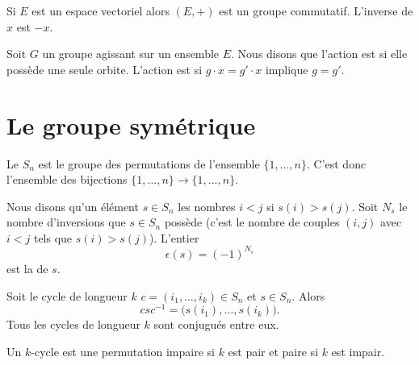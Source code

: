 \begin{example}     \label{ExemMaKdwt}
    Si \( E\) est un espace vectoriel alors \( (E,+)\) est un groupe commutatif. L'inverse de \( x\) est \( -x\).
\end{example}

\begin{definition}
    Soit \( G\) un groupe agissant sur un ensemble \( E\). Nous disons que l'action est  si elle possède une seule orbite. L'action est  si \( g\cdot x=g'\cdot x\) implique \( g=g'\).
\end{definition}

\section{Le groupe symétrique}

Le  \( S_n\) est le groupe des permutations de l'ensemble \( \{ 1,\ldots,n \}\). C'est donc l'ensemble des bijections \( \{ 1,\ldots, n \}\to\{ 1,\ldots, n \}\).

Nous disons qu'un élément \( s\in S_n\)  les nombres \( i<j\) si \( s(i)>s(j)\). Soit \( N_s\) le nombre d'inversions que \( s\in S_n\) possède (c'est le nombre de couples \( (i,j)\) avec \( i<j\) tels que \( s(i)>s(j)\)). L'entier
\begin{equation}
    \epsilon(s)=(-1)^{N_s}
\end{equation}
est la  de \( s\).

\begin{lemma}        \label{LemmvZFWP}
    Soit le cycle  de longueur \( k\) \( c=(i_1,\ldots, i_k)\in S_n\) et \( s\in S_n\). Alors
    \begin{equation}
        csc^{-1}=\big( s(i_1),\ldots, s(i_k) \big).
    \end{equation}
    Tous les cycles de longueur \( k\) sont conjugués entre eux.
\end{lemma}

\begin{lemma}       \label{LemhxnkMf}
    Un \( k\)-cycle est une permutation impaire si \( k\) est pair et paire si \( k\) est impair.
\end{lemma}

